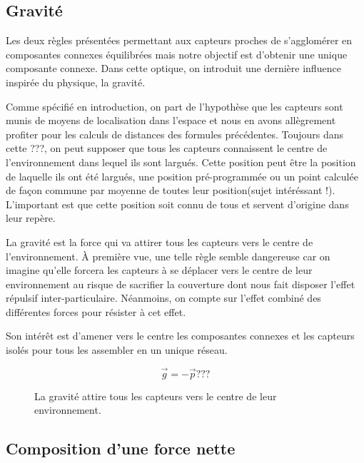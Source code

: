\documentclass[10pt]{article}
\begin{document}
\begin{multicols}{2}
\subsection*{Gravité}

Les deux règles présentées permettant aux capteurs proches de
s'agglomérer en composantes connexes équilibrées mais notre objectif
est d'obtenir une unique composante connexe. Dans cette optique, on
introduit une dernière influence inspirée du physique, la gravité.

Comme spécifié en introduction, on part de l'hypothèse que les
capteurs sont munis de moyens de localisation dans l'espace et nous en
avons allègrement profiter pour les calculs de distances des formules
précédentes. Toujours dans cette ???, on peut supposer que tous les
capteurs connaissent le centre de l'environnement dans lequel ils sont
largués. Cette position peut être la position de laquelle ils ont été
largués, une position pré-programmée ou un point calculée de façon
commune par moyenne de toutes leur position(sujet intéréssant
!). L'important est que cette position soit connu de tous et servent
d'origine dans leur repère.

La gravité est la force qui va attirer tous les capteurs vers le
centre de l'environnement. \`A première vue, une telle règle semble
dangereuse car on imagine qu'elle forcera les capteurs à se déplacer
vers le centre de leur environnement au risque de sacrifier la
couverture dont nous fait disposer l'effet répulsif
inter-particulaire. Néanmoins, on compte sur l'effet combiné des
différentes forces pour résister à cet effet.

Son intérêt est d'amener vers le centre les composantes connexes et
les capteurs isolés pour tous les assembler en un unique réseau.

$$
\vec{g} = -\vec{p} ???
$$

\begin{figure}[H]

  \centering

  

  \caption{La gravité attire tous les capteurs vers le centre de leur
    environnement.}
  \label{gravite}

\end{figure}

\subsection*{Composition d'une force nette}


\end{multicols}
\end{document}
